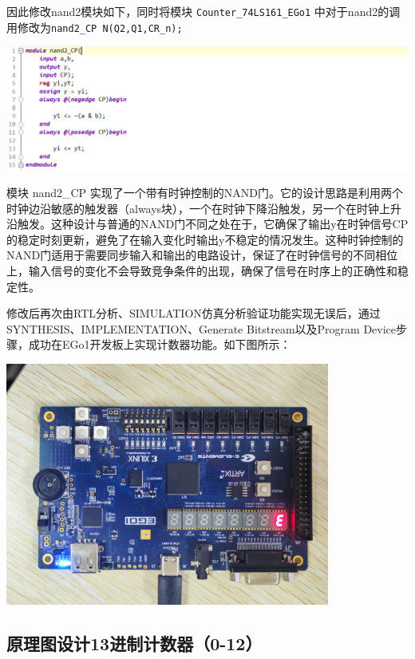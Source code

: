 \documentclass[a4,10pt,zihao=-4]{ctexart}
\begin{document}
因此修改nand2模块如下，同时将模块 \texttt{Counter\_74LS161\_EGo1} 中对于nand2的调用修改为\texttt{nand2\_CP N(Q2,Q1,CR\_n);}

\vspace{1em}
\noindent\includegraphics[width=1\textwidth]{assets/nand2_CP_code.png}

模块 nand2\_CP 实现了一个带有时钟控制的NAND门。它的设计思路是利用两个时钟边沿敏感的触发器（always块），一个在时钟下降沿触发，另一个在时钟上升沿触发。这种设计与普通的NAND门不同之处在于，它确保了输出y在时钟信号CP的稳定时刻更新，避免了在输入变化时输出y不稳定的情况发生。这种时钟控制的NAND门适用于需要同步输入和输出的电路设计，保证了在时钟信号的不同相位上，输入信号的变化不会导致竞争条件的出现，确保了信号在时序上的正确性和稳定性。

修改后再次由RTL分析、SIMULATION仿真分析验证功能实现无误后，通过SYNTHESIS、IMPLEMENTATION、Generate Bitstream以及Program Device步骤，成功在EGo1开发板上实现计数器功能。如下图所示：

\vspace{1em}
\noindent\includegraphics[width=0.8\textwidth]{assets/ego1.jpg}


\subsection{原理图设计13进制计数器（0-12）}
\end{document}
